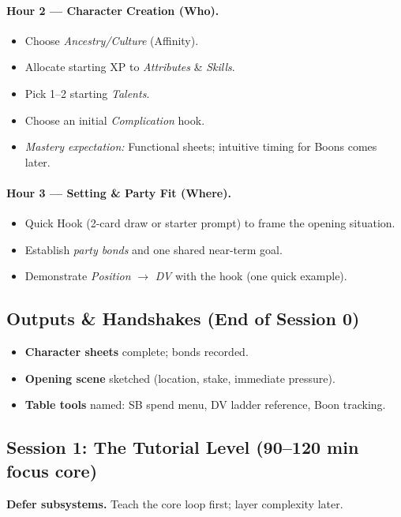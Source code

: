\paragraph{Hour 2 — Character Creation (Who).}
\begin{itemize}
  \item Choose \emph{Ancestry/Culture} (Affinity).
  \item Allocate starting XP to \emph{Attributes} \& \emph{Skills}.
  \item Pick 1–2 starting \emph{Talents}.
  \item Choose an initial \emph{Complication} hook.
  \item \textit{Mastery expectation:} Functional sheets; intuitive timing for Boons comes later.
\end{itemize}

\paragraph{Hour 3 — Setting \& Party Fit (Where).}
\begin{itemize}
  \item Quick Hook (2-card draw or starter prompt) to frame the opening situation.
  \item Establish \emph{party bonds} and one shared near-term goal.
  \item Demonstrate \emph{Position} $\rightarrow$ \emph{DV} with the hook (one quick example).
\end{itemize}

\subsection*{Outputs \& Handshakes (End of Session 0)}
\begin{itemize}
  \item \textbf{Character sheets} complete; bonds recorded.
  \item \textbf{Opening scene} sketched (location, stake, immediate pressure).
  \item \textbf{Table tools} named: SB spend menu, DV ladder reference, Boon tracking.
\end{itemize}

\subsection*{Session 1: The Tutorial Level (90–120 min focus core)}
\begin{tcolorbox}[title={Crucial Advice},colback=gray!5,colframe=black]
\textbf{Defer subsystems.} Teach the core loop first; layer complexity later.
\end{tcolorbox}

